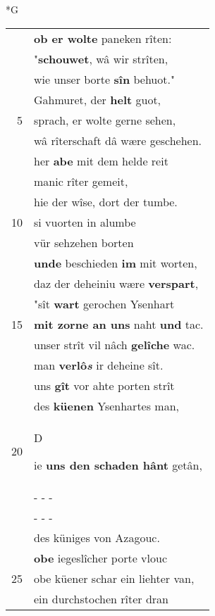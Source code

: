 \documentclass[8pt,a4paper,notitlepage]{article}
\begin{document}
\begin{table}[ht]
\begin{minipage}[t]{0.5\linewidth}
\end{minipage}
\end{table}
\newpage
\begin{table}[ht]
\begin{minipage}[t]{0.5\linewidth}
\small
\begin{center}*G
\end{center}
\begin{tabular}{rl}
 & \textbf{ob er wolte} paneken rîten:\\ 
 & "\textbf{schouwet}, wâ wir strîten,\\ 
 & wie unser borte \textbf{sîn} behuot."\\ 
 & Gahmuret, der \textbf{helt} guot,\\ 
5 & sprach, er wolte gerne sehen,\\ 
 & wâ rîterschaft dâ wære geschehen.\\ 
 & her \textbf{abe} mit dem helde reit\\ 
 & manic rîter gemeit,\\ 
 & hie der wîse, dort der tumbe.\\ 
10 & si vuorten in alumbe\\ 
 & vür sehzehen borten\\ 
 & \textbf{unde} beschieden \textbf{im} mit worten,\\ 
 & daz der deheiniu wære \textbf{verspart},\\ 
 & "sît \textbf{wart} gerochen Ysenhart\\ 
15 & \textbf{mit zorne an uns} naht \textbf{und} tac.\\ 
 & unser strît vil nâch \textbf{gelîche} wac.\\ 
 & man \textbf{verlô\textit{s}} ir deheine sît.\\ 
 & uns \textbf{gît} vor ahte porten strît\\ 
 & des \textbf{küenen} Ysenhartes man,\\ 
20 & \begin{large}D\end{large}ie \textbf{uns den schaden hânt} getân,\\ 
 & \multicolumn{1}{l}{ - - - }\\ 
 & \multicolumn{1}{l}{ - - - }\\ 
 & des küniges von Azagouc.\\ 
 & \textbf{obe} iegeslîcher porte vlouc\\ 
25 & obe küener schar ein liehter van,\\ 
 & ein durchstochen rîter dran\\ 

\end{tabular}
\end{minipage}
\end{table}
\end{document}
